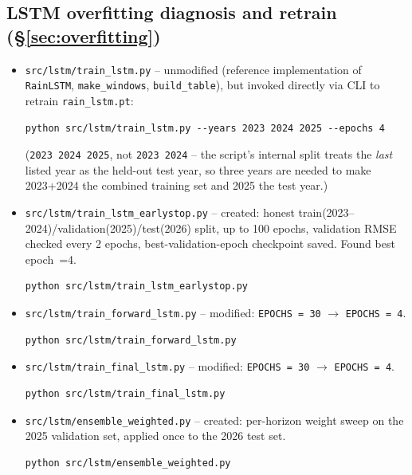 \documentclass[11pt]{article}
\begin{document}
\subsection{LSTM overfitting diagnosis and retrain (\S\ref{sec:overfitting})}
\begin{itemize}
  \item \texttt{src/lstm/train\_lstm.py} -- unmodified (reference implementation of
  \texttt{RainLSTM}, \texttt{make\_windows}, \texttt{build\_table}), but invoked directly
  via CLI to retrain \texttt{rain\_lstm.pt}:
  \begin{verbatim}
python src/lstm/train_lstm.py --years 2023 2024 2025 --epochs 4
  \end{verbatim}
  (\texttt{2023 2024 2025}, not \texttt{2023 2024} -- the script's internal split treats
  the \emph{last} listed year as the held-out test year, so three years are needed to
  make 2023+2024 the combined training set and 2025 the test year.)
  \item \texttt{src/lstm/train\_lstm\_earlystop.py} -- created: honest
  train(2023--2024)/validation(2025)/test(2026) split, up to 100 epochs, validation RMSE
  checked every 2 epochs, best-validation-epoch checkpoint saved. Found best epoch~=4.
  \begin{verbatim}
python src/lstm/train_lstm_earlystop.py
  \end{verbatim}
  \item \texttt{src/lstm/train\_forward\_lstm.py} -- modified: \texttt{EPOCHS = 30}
  $\to$ \texttt{EPOCHS = 4}.
  \begin{verbatim}
python src/lstm/train_forward_lstm.py
  \end{verbatim}
  \item \texttt{src/lstm/train\_final\_lstm.py} -- modified: \texttt{EPOCHS = 30}
  $\to$ \texttt{EPOCHS = 4}.
  \begin{verbatim}
python src/lstm/train_final_lstm.py
  \end{verbatim}
  \item \texttt{src/lstm/ensemble\_weighted.py} -- created: per-horizon weight sweep on
  the 2025 validation set, applied once to the 2026 test set.
  \begin{verbatim}
python src/lstm/ensemble_weighted.py
  \end{verbatim}
\end{itemize}
\end{document}
